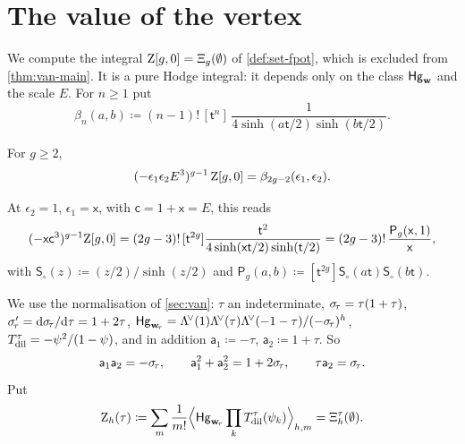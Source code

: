 \newcommand{\valSh}{\mathsf{Sh}}               %
\newcommand{\valb}{\mathsf{b}}                 %
\newcommand{\valBor}{\mathrm{Bor}}             %
\newcommand{\valnab}{\nabla}                   %

\section{The value of the vertex}
\label{sec:val}

We compute the integral $\mathrm{Z}[g,0]=\Xi_g(\emptyset)$ of \cref{def:set-fpot}, which is excluded from \cref{thm:van-main}. It is a pure Hodge integral: it depends only on the class $\mathsf{Hg}_{\mathbf{w}}$ and the scale $E$. For $n\geq 1$ put
\begin{equation}\label{eq:val-beta}
\beta_n(a,b)\coloneqq(n-1)!\,[\mathsf{t}^n]\,\frac{1}{4\sinh(a\mathsf{t}/2)\sinh(b\mathsf{t}/2)}.
\end{equation}

\begin{thm}\label{thm:val-main}
For $g\geq 2$,
\[
(-\epsilon_1\epsilon_2E^3)^{g-1}\,\mathrm{Z}[g,0]=\beta_{2g-2}(\epsilon_1,\epsilon_2).
\]
\end{thm}

\begin{rmk}
At $\epsilon_2=1$, $\epsilon_1=\mathsf{x}$, with $\mathsf{c}=1+\mathsf{x}=E$, this reads
\[
(-\mathsf{x}\mathsf{c}^3)^{g-1}\mathrm{Z}[g,0]=(2g-3)!\,[\mathsf{t}^{2g}]\frac{\mathsf{t}^2}{4\sinh(\mathsf{x}\mathsf{t}/2)\sinh(\mathsf{t}/2)}=(2g-3)!\,\frac{\mathsf{P}_g(\mathsf{x},1)}{\mathsf{x}},
\]
with $\mathsf{S}_{\circ}(z)\coloneqq(z/2)/\sinh(z/2)$ and $\mathsf{P}_g(a,b)\coloneqq[\mathsf{t}^{2g}]\mathsf{S}_{\circ}(a\mathsf{t})\mathsf{S}_{\circ}(b\mathsf{t})$.
\end{rmk}

We use the normalisation of \cref{sec:van}: $\tau$ an indeterminate, $\sigma_{\!\tau}=\tau(1+\tau)$, $\sigma_{\!\tau}'=\mathrm{d}\sigma_{\!\tau}/\mathrm{d}\tau=1+2\tau$, $\mathsf{Hg}_{\mathbf{w}_{\!\tau}}=\Lambda^{\!\vee}(1)\Lambda^{\!\vee}(\tau)\Lambda^{\!\vee}(-1-\tau)/(-\sigma_{\!\tau})^h$, $T_{\mathrm{dil}}^{\tau}=-\psi^2/(1-\psi)$, and in addition $\mathsf{a}_1\coloneqq-\tau$, $\mathsf{a}_2\coloneqq1+\tau$. So
\[
\mathsf{a}_1\mathsf{a}_2=-\sigma_{\!\tau},\qquad\mathsf{a}_1^2+\mathsf{a}_2^2=1+2\sigma_{\!\tau},\qquad\tau\mathsf{a}_2=\sigma_{\!\tau}.
\]
Put
\[
\mathrm{Z}_h(\tau)\coloneqq\sum_m\frac{1}{m!}\Bigl\langle\mathsf{Hg}_{\mathbf{w}_{\!\tau}}\prod_kT_{\mathrm{dil}}^{\tau}(\psi_k)\Bigr\rangle_{h,m}=\Xi^{\tau}_h(\emptyset).
\]

